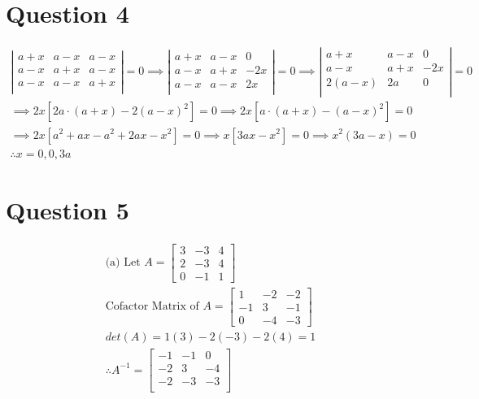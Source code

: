 \documentclass[12pt, a4paper]{article}
\begin{document}
\section{Question 4}
\begin{gather*}
  \left| \begin{array}{ccc}
    a + x & a - x & a - x\\
    a - x & a + x & a - x\\
    a - x & a - x & a + x\\
  \end{array} \right| = 0 \implies
  \left| \begin{array}{ccc}
    a + x & a - x & 0\\
    a - x & a + x & -2x\\
    a - x & a - x & 2x\\
  \end{array} \right| = 0 \implies
  \left| \begin{array}{ccc}
    a + x & a - x & 0\\
    a - x & a + x & -2x\\
    2(a - x) & 2a & 0\\
  \end{array} \right| = 0 \\[5pt]
  \implies
  2x [2a \cdot (a + x) - 2(a-x)^2] = 0 \implies
  2x [a \cdot (a + x) - (a-x)^2] = 0 \\ \implies 
  2x [a^2 + ax - a^2 + 2ax - x^2] = 0 \implies
  x [3ax - x^2] = 0 \implies x^2(3a - x) = 0 \\
  \therefore x = 0, 0, 3a
\end{gather*}

\section{Question 5}
\begin{gather*}
  \text{(a) Let } A = 
  \left[ \begin{array}{ccc}
    3 & -3 & 4 \\
    2 & -3 & 4 \\
    0 & -1 & 1
  \end{array} \right] \\[5pt]
  \text{Cofactor Matrix of } A = 
  \left[ \begin{array}{ccc}
    1 & -2 & -2 \\ 
    -1 & 3 & -1 \\
    0 & -4 & -3
  \end{array} \right] \\[5pt]
  det(A) = 1(3) -2(-3) -2(4) = 1 \\[5pt]
  \therefore A^{-1} = 
  \left[ \begin{array}{ccc}
    -1 & -1 & 0 \\
    -2 & 3 & -4 \\
    -2 & -3 & -3 \\
  \end{array} \right] \\[5pt]
\end{gather*}
\end{document}
